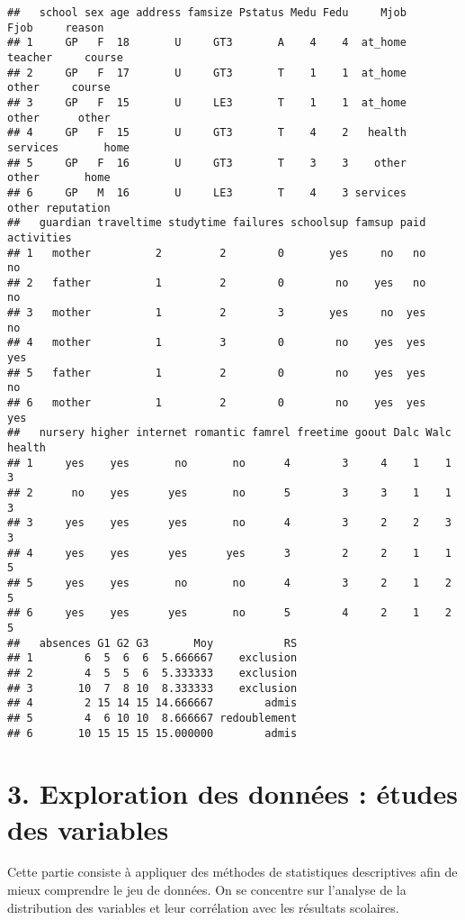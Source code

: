 \documentclass[
]{article}
\begin{document}
\begin{verbatim}
##   school sex age address famsize Pstatus Medu Fedu     Mjob     Fjob     reason
## 1     GP   F  18       U     GT3       A    4    4  at_home  teacher     course
## 2     GP   F  17       U     GT3       T    1    1  at_home    other     course
## 3     GP   F  15       U     LE3       T    1    1  at_home    other      other
## 4     GP   F  15       U     GT3       T    4    2   health services       home
## 5     GP   F  16       U     GT3       T    3    3    other    other       home
## 6     GP   M  16       U     LE3       T    4    3 services    other reputation
##   guardian traveltime studytime failures schoolsup famsup paid activities
## 1   mother          2         2        0       yes     no   no         no
## 2   father          1         2        0        no    yes   no         no
## 3   mother          1         2        3       yes     no  yes         no
## 4   mother          1         3        0        no    yes  yes        yes
## 5   father          1         2        0        no    yes  yes         no
## 6   mother          1         2        0        no    yes  yes        yes
##   nursery higher internet romantic famrel freetime goout Dalc Walc health
## 1     yes    yes       no       no      4        3     4    1    1      3
## 2      no    yes      yes       no      5        3     3    1    1      3
## 3     yes    yes      yes       no      4        3     2    2    3      3
## 4     yes    yes      yes      yes      3        2     2    1    1      5
## 5     yes    yes       no       no      4        3     2    1    2      5
## 6     yes    yes      yes       no      5        4     2    1    2      5
##   absences G1 G2 G3       Moy           RS
## 1        6  5  6  6  5.666667    exclusion
## 2        4  5  5  6  5.333333    exclusion
## 3       10  7  8 10  8.333333    exclusion
## 4        2 15 14 15 14.666667        admis
## 5        4  6 10 10  8.666667 redoublement
## 6       10 15 15 15 15.000000        admis
\end{verbatim}

\hypertarget{exploration-des-donnuxe9es-uxe9tudes-des-variables}{%
\section{3. Exploration des données : études des
variables}\label{exploration-des-donnuxe9es-uxe9tudes-des-variables}}

Cette partie consiste à appliquer des méthodes de statistiques
descriptives afin de mieux comprendre le jeu de données. On se concentre
sur l'analyse de la distribution des variables et leur corrélation avec
les résultats scolaires.
\end{document}
